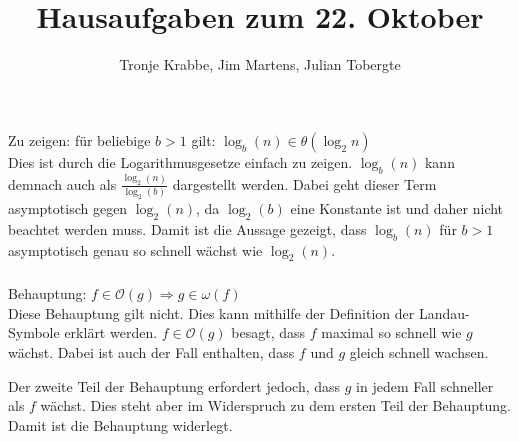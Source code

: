 \documentclass[10pt,a4paper,oneside,ngerman,numbers=noenddot]{scrartcl}
\begin{document}
\author{Tronje Krabbe, Jim Martens, Julian Tobergte}
\title{Hausaufgaben zum 22. Oktober}
\maketitle
\section{} %
	\subsection{} %
	\subsection{} %
		\subsubsection{} %
		Zu zeigen: für beliebige $b > 1$ gilt: $\log_{b}(n) \in \mathcal{\theta} (\log_{2}n)$\\
		Dies ist durch die Logarithmusgesetze einfach zu zeigen. $\log_{b}(n)$ kann demnach auch als $\frac{\log_{2}(n)}{\log_{2}(b)}$ dargestellt werden. Dabei geht dieser Term asymptotisch gegen $\log_{2}(n)$, da $\log_{2}(b)$ eine Konstante ist und daher nicht beachtet werden muss. Damit ist die Aussage gezeigt, dass $\log_{b}(n)$ für $b > 1$ asymptotisch genau so schnell wächst wie $\log_{2}(n)$.
		\subsubsection{} %
		Behauptung: $f \in \mathcal{O}(g) \Rightarrow g \in \omega (f)$\\
		Diese Behauptung gilt nicht. Dies kann mithilfe der Definition der Landau-Symbole erklärt werden. $f \in \mathcal{O}(g)$ besagt, dass $f$ maximal so schnell wie $g$ wächst. Dabei ist auch der Fall enthalten, dass $f$ und $g$ gleich schnell wachsen.
		
		Der zweite Teil der Behauptung erfordert jedoch, dass $g$ in jedem Fall schneller als $f$ wächst. Dies steht aber im Widerspruch zu dem ersten Teil der Behauptung. Damit ist die Behauptung widerlegt. 
		\subsubsection{} %
\section{} %
\end{document}
